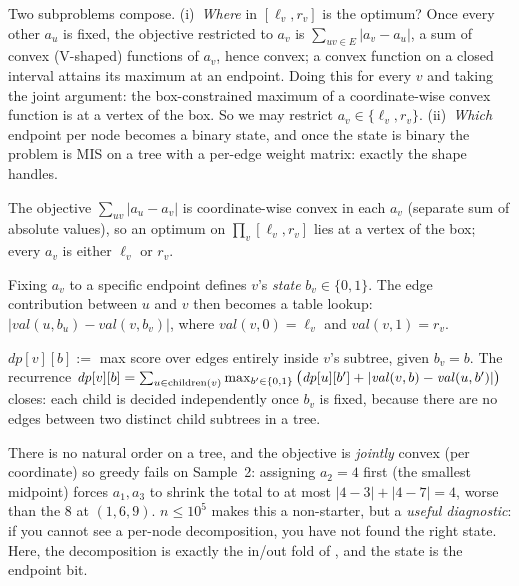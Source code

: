 Two subproblems compose. (i)~\emph{Where} in $[\ell_v,r_v]$ is the optimum?
Once every other $a_u$ is fixed, the objective restricted to $a_v$ is
$\sum_{uv\in E}|a_v-a_u|$, a sum of convex (V-shaped) functions of $a_v$,
hence convex; a convex function on a closed interval attains its maximum
at an endpoint. Doing this for every $v$ and taking the joint argument:
the box-constrained maximum of a coordinate-wise convex function is at a
vertex of the box. So we may restrict $a_v\in\{\ell_v,r_v\}$.
(ii)~\emph{Which} endpoint per node becomes a binary state, and once the
state is binary the problem is MIS on a tree with a per-edge weight
matrix: exactly the shape  handles.

\begin{observation}
The objective $\sum_{uv}|a_u-a_v|$ is coordinate-wise convex in each $a_v$
(separate sum of absolute values), so an optimum on $\prod_v[\ell_v,r_v]$
lies at a vertex of the box; every $a_v$ is either $\ell_v$ or $r_v$.
\end{observation}
\begin{observation}
Fixing $a_v$ to a specific endpoint defines $v$'s \emph{state} $b_v\in\{0,1\}$.
The edge contribution between $u$ and $v$ then becomes a table lookup:
$|{\mathit{val}(u,b_u)-\mathit{val}(v,b_v)}|$, where
$\mathit{val}(v,0)=\ell_v$ and $\mathit{val}(v,1)=r_v$.
\end{observation}
\begin{observation}
$\mathit{dp}[v][b] :=$ max score over edges entirely inside $v$'s subtree,
given $b_v=b$. The recurrence
$\mathit{dp}[v][b]=\sum_{u\in\operatorname{children}(v)}\max_{b'\in\{0,1\}}\big(\mathit{dp}[u][b'] + |\mathit{val}(v,b)-\mathit{val}(u,b')|\big)$
closes: each child is decided independently once $b_v$ is fixed, because
there are no edges between two distinct child subtrees in a tree.
\end{observation}

\begin{thinkbox}
{There is no natural order on a tree, and the objective is \emph{jointly}
convex (per coordinate) so greedy fails on Sample~2: assigning $a_2=4$
first (the smallest midpoint) forces $a_1,a_3$ to shrink the total to at
most $|4-3|+|4-7|=4$, worse than the $8$ at $(1,6,9)$.}
{$n\le 10^{5}$ makes this a non-starter, but a \emph{useful diagnostic}: if
you cannot see a per-node decomposition, you have not found the right
state. Here, the decomposition is exactly the in/out fold of
, and the state is the endpoint bit.}
\end{thinkbox}

